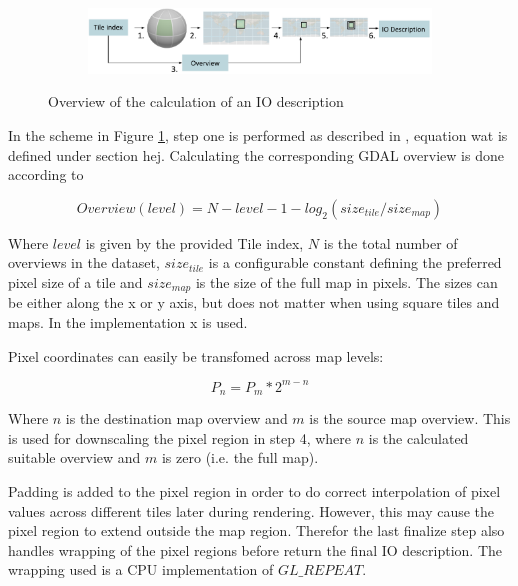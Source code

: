 \begin{figure}[htbp]
    \centering
    \begin{subfigure}[bt]{0.9\textwidth}
        \includegraphics[width=\textwidth]{figures/implementation/pipeline/getiodescription.pdf}
    \end{subfigure}
    \caption{Overview of the calculation of an IO description}
    \label{fig:getiodescription}
\end{figure}

In the scheme in Figure \ref{fig:getiodescription}, step one is performed as described in , equation wat is defined under section hej. 
Calculating the corresponding GDAL overview is done according to

\begin{equation}
\label{eq:overview}
Overview(level) = N - level - 1 - log_2(size_{tile} / size_{map})
\end{equation}

Where $level$ is given by the provided Tile index, $N$ is the total number of overviews in the dataset, $size_{tile}$ is a configurable constant defining the preferred pixel size of a tile and $size_{map}$ is the size of the full map in pixels. The sizes can be either along the x or y axis, but does not matter when using square tiles and maps. In the implementation x is used.

Pixel coordinates can easily be transfomed across map levels:

\begin{equation}
\label{eq:overview}
P_{n} = P_{m} * 2^{m-n}
\end{equation}

Where $n$ is the destination map overview and $m$ is the source map overview. This is used for downscaling the pixel region in step 4, where $n$ is the calculated suitable overview and $m$ is zero (i.e. the full map). 

Padding is added to the pixel region in order to do correct interpolation of pixel values across different tiles later during rendering. However, this may cause the pixel region to extend outside the map region. Therefor the last finalize step also handles wrapping of the pixel regions before return the final IO description. The wrapping used is a CPU implementation of $GL\_REPEAT$.

